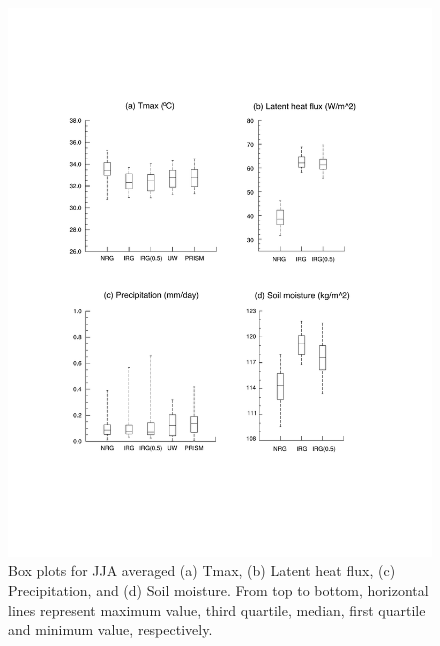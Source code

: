 \documentclass[draft,ms]{agutex}   %
\begin{document}
\begin{figure}
\begin{center}
\includegraphics[width=6in]{irrig_boxplot.pdf}
\caption{Box plots for JJA averaged  (a) Tmax, (b) Latent heat flux, (c) Precipitation, and (d) Soil moisture.  From top to bottom, horizontal lines represent maximum value, third quartile, median, first quartile and minimum value, respectively.} 
\label{fig:Figure 4}
\end{center}
\end{figure}
\end{document}
